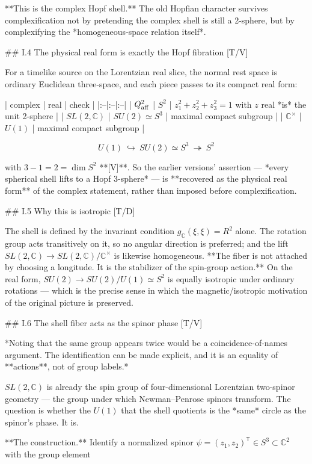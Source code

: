 **This is the complex Hopf shell.** The old Hopfian character survives complexification not by pretending the complex shell is still a 2-sphere, but by complexifying the *homogeneous-space relation itself*.

## I.4 The physical real form is exactly the Hopf fibration [T/V]

For a timelike source on the Lorentzian real slice, the normal rest space is ordinary Euclidean three-space, and each piece passes to its compact real form:

| complex | real | check |
|:--|:--|:--|
| $Q^2_{\rm aff}$ | $S^2$ | $z_1^2+z_2^2+z_3^2 = 1$ with $z$ real *is* the unit 2-sphere |
| $SL(2,\mathbb{C})$ | $SU(2)\simeq S^3$ | maximal compact subgroup |
| $\mathbb{C}^\times$ | $U(1)$ | maximal compact subgroup |

$$\boxed{\ U(1)\ \hookrightarrow\ SU(2)\simeq S^3\ \twoheadrightarrow\ S^2\ }$$

with $3-1 = 2 = \dim S^2$ **[V]**. So the earlier versions' assertion — *every spherical shell lifts to a Hopf 3-sphere* — is **recovered as the physical real form** of the complex statement, rather than imposed before complexification.

## I.5 Why this is isotropic [T/D]

The shell is defined by the invariant condition $g_\mathbb{C}(\xi,\xi) = R^2$ alone. The rotation group acts transitively on it, so no angular direction is preferred; and the lift $SL(2,\mathbb{C})\to SL(2,\mathbb{C})/\mathbb{C}^\times$ is likewise homogeneous. **The fiber is not attached by choosing a longitude. It is the stabilizer of the spin-group action.** On the real form, $SU(2)\to SU(2)/U(1)\simeq S^2$ is equally isotropic under ordinary rotations — which is the precise sense in which the magnetic/isotropic motivation of the original picture is preserved.

## I.6 The shell fiber acts as the spinor phase [T/V]

*Noting that the same group appears twice would be a coincidence-of-names argument. The identification can be made explicit, and it is an equality of **actions**, not of group labels.*

$SL(2,\mathbb{C})$ is already the spin group of four-dimensional Lorentzian two-spinor geometry — the group under which Newman–Penrose spinors transform. The question is whether the $U(1)$ that the shell quotients is the *same* circle as the spinor's phase. It is.

**The construction.** Identify a normalized spinor $\psi = (z_1,z_2)^{\mathsf T}\in S^3\subset\mathbb{C}^2$ with the group element

